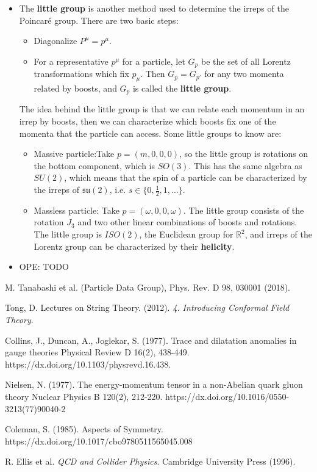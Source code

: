 \documentclass[11pt, oneside]{article}   	%
\theoremstyle{definition}
\numberwithin{equation}{subsection}		%
\begin{document}
\begin{itemize}
	\item The \textbf{little group} is another method used to determine the irreps of the Poincar\'e group. There are two basic steps:
	\begin{itemize}
		\item Diagonalize $P^\mu = p^\mu$.
		\item For a representative $p^\mu$ for a particle, let $G_p$ be the set of all Lorentz transformations which fix $p_\mu$. Then $G_p = 
		G_{p'}$ for any two momenta related by boosts, and $G_p$ is called the \textbf{little group}. 
	\end{itemize}
	The idea behind the little group is that we can relate each momentum in an irrep by boosts, then we can characterize which boosts fix 
	one of the momenta that the particle can access. Some little groups to know are:
	\begin{itemize}
		\item Massive particle:Take $p = (m, 0, 0, 0)$, so the little group is rotations on the bottom component, which is $SO(3)$. This has the 
		same algebra as $SU(2)$, which means that the spin of a particle can be characterized by the irreps of $\mathfrak{su}(2)$, i.e. 
		$s\in \{0, \frac{1}{2}, 1, ...\}$. 
		\item Massless particle: Take $p = (\omega, 0, 0, \omega)$. The little group consists of the rotation $J_3$ and two other linear combinations 
		of boosts and rotations. The little group is $ISO(2)$, the Euclidean group for $\mathbb R^2$, and irreps of the Lorentz group can be 
		characterized by their \textbf{helicity}. 
	\end{itemize}
	
	\item OPE: TODO
	
\end{itemize}

\newpage
\begin{thebibliography}{99}

M. Tanabashi et al. (Particle Data Group), Phys. Rev. D 98, 030001 (2018).

Tong, D. Lectures on String Theory. (2012). \textit{4. Introducing Conformal Field Theory}.

Collins, J., Duncan, A., Joglekar, S. (1977). Trace and dilatation anomalies in gauge theories Physical Review D  16(2), 438-449. https://dx.doi.org/10.1103/physrevd.16.438.

Nielsen, N. (1977). The energy-momentum tensor in a non-Abelian quark gluon theory Nuclear Physics B  120(2), 212-220. https://dx.doi.org/10.1016/0550-3213(77)90040-2

Coleman, S. (1985). Aspects of Symmetry. https://dx.doi.org/10.1017/cbo9780511565045.008


R. Ellis et al. \textit{QCD and Collider Physics}. Cambridge University Press (1996).


\end{thebibliography}
\end{document}
